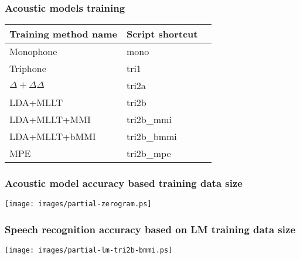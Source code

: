 \begin{frame}\frametitle{Acoustic models training} 
    
    \small{\begin{tabular}{lll}
    \hline
    Training method name & Script shortcut \\
    \hline
    Monophone & mono \\
    Triphone  & tri1 \\
    $\Delta + \Delta\Delta$ & tri2a  \\
    LDA+MLLT & tri2b  \\
    LDA+MLLT+MMI & tri2b\_mmi \\
    LDA+MLLT+bMMI & tri2b\_bmmi \\
    MPE & tri2b\_mpe \\
    \hline
    \end{tabular}}
\end{frame}


\begin{frame}\frametitle{Acoustic model accuracy based training data size} 
    \texttt{[image: images/partial-zerogram.ps]}
\end{frame}


\begin{frame}\frametitle{Speech recognition accuracy based on LM training data size} 
    \texttt{[image: images/partial-lm-tri2b-bmmi.ps]}
\end{frame}


